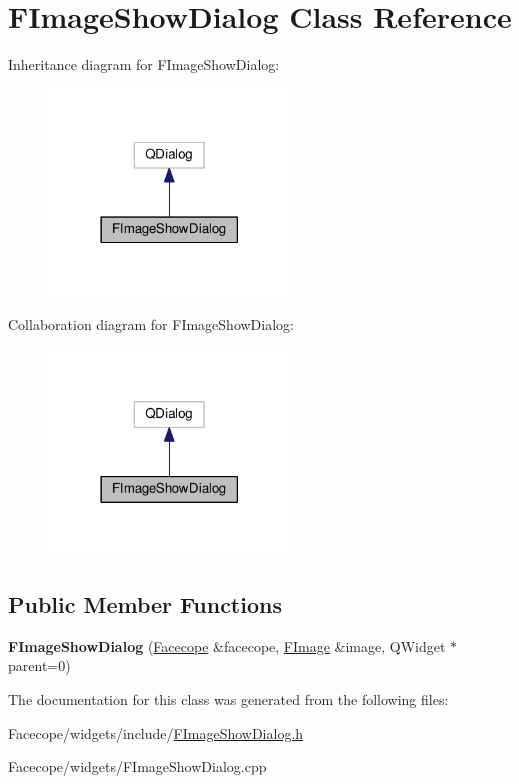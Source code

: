 \hypertarget{classFImageShowDialog}{}\section{F\+Image\+Show\+Dialog Class Reference}
\label{classFImageShowDialog}


Inheritance diagram for F\+Image\+Show\+Dialog\+:
\nopagebreak
\begin{figure}[H]
\begin{center}
\leavevmode
\includegraphics[width=182pt]{classFImageShowDialog__inherit__graph}
\end{center}
\end{figure}


Collaboration diagram for F\+Image\+Show\+Dialog\+:
\nopagebreak
\begin{figure}[H]
\begin{center}
\leavevmode
\includegraphics[width=182pt]{classFImageShowDialog__coll__graph}
\end{center}
\end{figure}
\subsection*{Public Member Functions}
\begin{DoxyCompactItemize}
\item 
\mbox{\label{classFImageShowDialog_a4c7b77746ae11fe69bdca3262b311c5a}} 
{\bfseries F\+Image\+Show\+Dialog} (\hyperlink{structFacecope}{Facecope} \&facecope, \hyperlink{classFImage}{F\+Image} \&image, Q\+Widget $\ast$parent=0)
\end{DoxyCompactItemize}


The documentation for this class was generated from the following files\+:\begin{DoxyCompactItemize}
\item 
Facecope/widgets/include/\hyperlink{FImageShowDialog_8h}{F\+Image\+Show\+Dialog.\+h}\item 
Facecope/widgets/F\+Image\+Show\+Dialog.\+cpp\end{DoxyCompactItemize}

